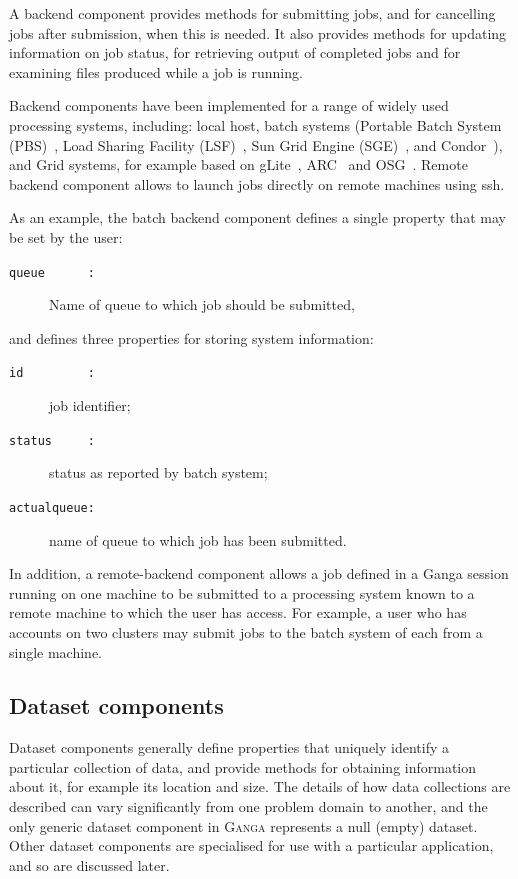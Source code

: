 \documentclass{elsart}
\def\ganga {\textsc{Ganga}\xspace}
\def\grid {Grid\xspace}
\newcommand{\code}[1]{\texttt{#1}}
\begin{document}
A backend component provides methods for submitting jobs, and for cancelling
jobs after submission, when this is needed.  It also provides methods for
updating information on job status, for retrieving output of completed jobs
and for examining files produced while a job is running.

Backend components have been implemented for a range of widely used
processing systems, including: local host, batch systems
(Portable Batch System (PBS)~\cite{henderson_1995},
Load Sharing Facility (LSF)~\cite{schwickerath_2008},
Sun Grid Engine (SGE)~\cite{gentzsch_2001},
and Condor~\cite{thain_2005}), and \grid systems, for example  based on
gLite~\cite{andreetto_2008}, ARC~\cite{ellert_2007} and OSG~\cite{OSG}.
Remote backend component allows to launch jobs directly on remote machines 
using ssh.  


As an example, the batch backend component defines a
single property that may be set by the user:
\begin{description}
\item[\code{queue~~~~~~:}] Name of queue to which job should be submitted,
\end{description}
and defines three properties for storing system information:
\begin{description}
\item[\code{id~~~~~~~~~:}] job identifier;
\item[\code{status~~~~~:}] status as reported by batch system;
\item[\code{actualqueue:}] name of queue to which job has been submitted.
\end{description}

In addition, a remote-backend component allows a job defined in a Ganga
session running on one machine to be submitted to a processing system
known to a remote machine to which the user has access.  For example,
a user who has accounts on two clusters may submit jobs to the batch system
of each from a single machine.

\subsection{Dataset components}
Dataset components generally define properties that uniquely identify a
particular collection of data, and provide methods for obtaining information
about it, for example its location and size. The details of how data
collections are described can vary significantly from one problem domain to
another, and the only generic dataset component in \ganga represents a null
(empty) dataset.  Other dataset components are specialised for use with a
particular application, and so are discussed later.
\end{document}
